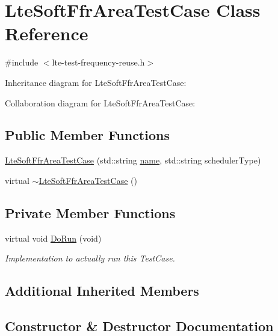 \hypertarget{classLteSoftFfrAreaTestCase}{}\section{Lte\+Soft\+Ffr\+Area\+Test\+Case Class Reference}
\label{classLteSoftFfrAreaTestCase}


{\ttfamily \#include $<$lte-\/test-\/frequency-\/reuse.\+h$>$}



Inheritance diagram for Lte\+Soft\+Ffr\+Area\+Test\+Case\+:


Collaboration diagram for Lte\+Soft\+Ffr\+Area\+Test\+Case\+:
\subsection*{Public Member Functions}
\begin{DoxyCompactItemize}
\item 
\hyperlink{classLteSoftFfrAreaTestCase_afd34d6b31a3bb3d86c7f20a041ea00d5}{Lte\+Soft\+Ffr\+Area\+Test\+Case} (std\+::string \hyperlink{generate__test__data__lte__spectrum__model_8m_ab74e6bf80237ddc4109968cedc58c151}{name}, std\+::string scheduler\+Type)
\item 
virtual \hyperlink{classLteSoftFfrAreaTestCase_ab48217aff2e317c305a99f4809980ec2}{$\sim$\+Lte\+Soft\+Ffr\+Area\+Test\+Case} ()
\end{DoxyCompactItemize}
\subsection*{Private Member Functions}
\begin{DoxyCompactItemize}
\item 
virtual void \hyperlink{classLteSoftFfrAreaTestCase_aaf88ccad780563fc6394cd97ec9328d4}{Do\+Run} (void)
\begin{DoxyCompactList}\small\item\em Implementation to actually run this Test\+Case. \end{DoxyCompactList}\end{DoxyCompactItemize}
\subsection*{Additional Inherited Members}


\subsection{Constructor \& Destructor Documentation}
